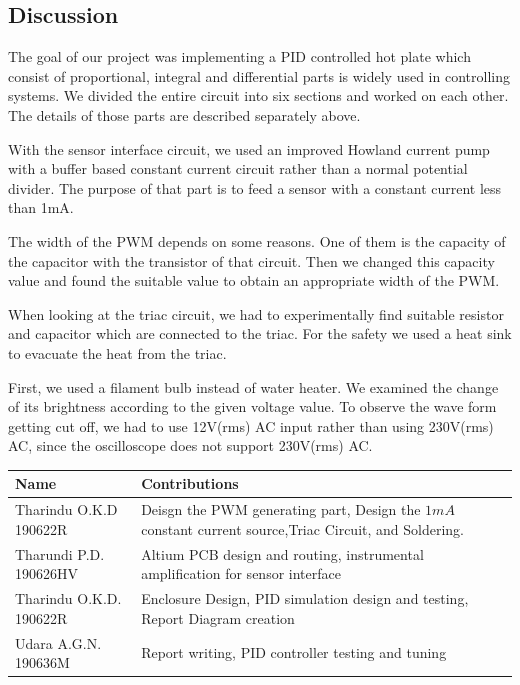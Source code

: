 \begin{multicols}{2}
{\let\clearpage\relax \chapter{Discussion}}

The goal of our project was implementing a PID controlled hot plate which consist of proportional, integral and differential parts is widely used in controlling systems. We divided the entire circuit into six sections and worked on each other. The details of those parts are described separately above.

With the sensor interface circuit, we used an improved Howland current pump with a buffer based constant current circuit rather than a normal potential divider. The purpose of that part is to feed a sensor with a constant current less than 1mA.

The width of the PWM depends on some reasons. One of them is the capacity of the capacitor with the transistor of that circuit. Then we changed this capacity value and found the suitable value to obtain an appropriate width of the PWM.

When looking at the triac circuit, we had to experimentally find suitable resistor and capacitor which are connected to the triac. For the safety we used a heat sink to evacuate the heat from the triac.

First, we used a filament bulb instead of water heater. We examined the change of its brightness according to the given voltage value. To observe the wave form getting cut off, we had to use 12V(rms) AC input rather than using 230V(rms) AC, since the oscilloscope does not support 230V(rms) AC.


\end{multicols}

\begin{center}
\begin{tabular}{ p{} p{} }
\hline
 \textbf{Name} & \textbf{Contributions} \\
 \hline
 Tharindu O.K.D 190622R  & Deisgn the PWM generating part, Design the $1mA$ constant current source,Triac Circuit, and Soldering. \\  
 Tharundi P.D. 190626HV & Altium PCB design and routing, instrumental amplification for sensor interface \\
 Tharindu O.K.D. 190622R & Enclosure Design, PID simulation design and testing, Report Diagram creation\\
 Udara A.G.N. 190636M & Report writing, PID controller testing and tuning\\

 \hline
\end{tabular}
\end{center}